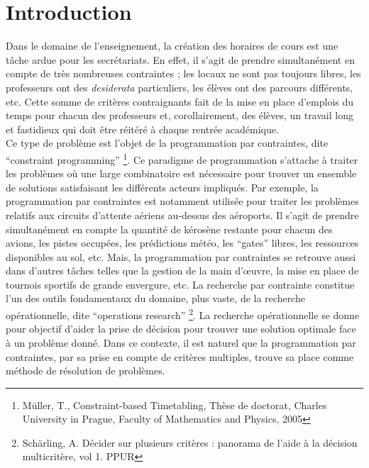

\chapter*{Introduction}

Dans le domaine de l'enseignement, la création des horaires de cours est une tâche ardue pour les secrétariats. En effet, il s'agit de prendre simultanément en compte de très nombreuses contraintes ; les locaux ne sont pas toujours libres, les professeurs ont des \textit{desiderata} particuliers, les élèves ont des parcours différents, etc. Cette somme de critères contraignants fait de la mise en place d'emplois du temps pour chacun des professeurs et, corollairement, des élèves, un travail long et fastidieux qui doit être réitéré à chaque rentrée académique.\\
\newline
\indent
Ce type de problème est l'objet de la programmation par contraintes, dite \enquote{constraint programming} \footnote{Müller, T., Constraint-based Timetabling, Thèse de doctorat, Charles University in Prague, Faculty of Mathematics and Physics, 2005}. Ce paradigme de programmation s'attache à traiter les problèmes où une large combinatoire est nécessaire pour trouver un ensemble de solutions satisfaisant les différents acteurs impliqués. Par exemple, la programmation par contraintes est notamment utilisée pour traiter les problèmes relatifs aux circuits d'attente aériens au-dessus des aéroports. Il s'agit de prendre simultanément en compte la quantité de kérosène restante pour chacun des avions, les pistes occupées, les prédictions météo, les \enquote{gates} libres, les ressources disponibles au sol, etc. Mais, la programmation par contraintes se retrouve aussi dans d'autres tâches telles que la gestion de la main d’œuvre, la mise en place de tournois sportifs de grande envergure, etc.
\newline
\indent
La recherche par contrainte constitue l'un des outils fondamentaux du domaine, plus vaste, de la 
recherche opérationnelle, dite \enquote{operations research} \footnote{Schärling, A. Décider sur plusieurs critères : panorama de l'aide à la décision multicritère, vol 1. PPUR}. La recherche opérationnelle se donne pour objectif d'aider la prise de décision pour trouver une solution optimale face à un problème donné. Dans ce contexte, il est naturel que la programmation par contraintes, par sa prise en compte de critères multiples, trouve sa place comme méthode de résolution de problèmes.\\
